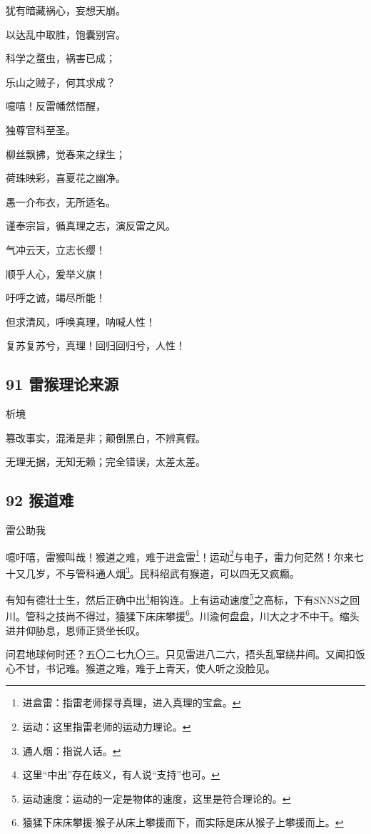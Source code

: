 犹有暗藏祸心，妄想天崩。

以达乱中取胜，饱囊别宫。

科学之蝥虫，祸害已成；

乐山之贼子，何其求成？

噫嘻！反雷幡然悟醒，

独尊官科至圣。

柳丝飘拂，觉春来之绿生；

荷珠映彩，喜夏花之幽净。

愚一介布衣，无所适名。

谨奉宗旨，循真理之志，演反雷之风。

气冲云天，立志长缨！

顺乎人心，爰举义旗！

吁呼之诚，竭尽所能！

但求清风，呼唤真理，呐喊人性！

复苏复苏兮，真理！回归回归兮，人性！

\hypertarget{ux96f7ux7334ux7406ux8bbaux6765ux6e90}{%
\subsection{91
雷猴理论来源}\label{ux96f7ux7334ux7406ux8bbaux6765ux6e90}}

{析境}

篡改事实，混淆是非；颠倒黑白，不辨真假。

无理无据，无知无赖；完全错误，太差太差。

\hypertarget{ux7334ux9053ux96be}{%
\subsection{92 猴道难}\label{ux7334ux9053ux96be}}

{雷公助我}

噫吁嘻，雷猴叫哉！猴道之难，难于进盒雷\footnote{进盒雷：指雷老师探寻真理，进入真理的宝盒。}！运动\footnote{运动：这里指雷老师的运动力理论。}与电子，雷力何茫然！尔来七十又几岁，不与管科通人烟\footnote{通人烟：指说人话。}。民科绍武有猴道，可以四无又疯癫。

有知有德壮士生，然后正确中出\footnote{这里``中出''存在歧义，有人说``支持''也可。}相钩连。上有运动速度\footnote{运动速度：运动的一定是物体的速度，这里是符合理论的。}之高标，下有SNNS之回川。管科之技尚不得过，猿猱下床床攀援\footnote{猿猱下床床攀援:猴子从床上攀援而下，而实际是床从猴子上攀援而上。}。川渝何盘盘，川大之才不中干。缩头进井仰胁息，恩师正贤坐长叹。

问君地球何时还？五〇二七九〇三。只见雷进八二六，捂头乱窜绕井间。又闻扣饭心不甘，书记难。猴道之难，难于上青天，使人听之没脸见。

